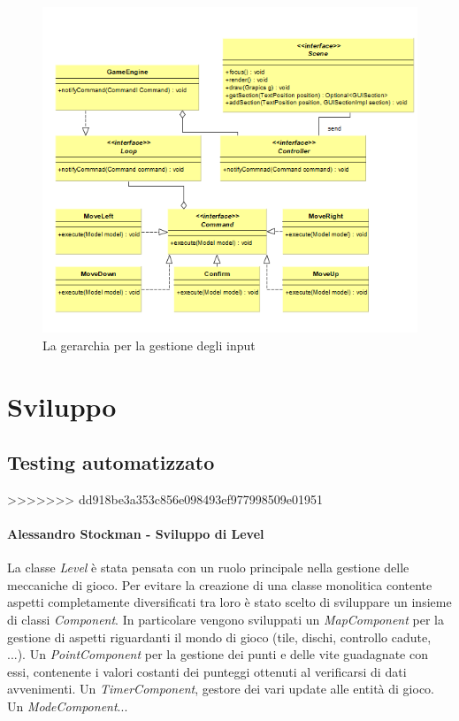 \documentclass[a4paper,12pt, hidelinks]{report}
\begin{document}
\begin{figure}[H]
\centering{}
\includegraphics[width=\linewidth]{img/PatternCommand}
\caption{La gerarchia per la gestione degli input}
\label{img:GerarchiaSound}
\end{figure}


\chapter{Sviluppo}
\section{Testing automatizzato}
>>>>>>> dd918be3a353c856e098493ef977998509e01951

\begin{flushright}
\item\subsubsection{Alessandro Stockman - Sviluppo di Level}
\end{flushright}

La classe \emph{Level} è stata pensata con un ruolo principale nella gestione delle meccaniche di gioco. Per evitare la creazione di una classe monolitica contente aspetti completamente diversificati tra loro è stato scelto di sviluppare un insieme di classi \emph{Component}.
In particolare vengono sviluppati un \emph{MapComponent} per la gestione di aspetti riguardanti il mondo di gioco (tile, dischi, controllo cadute, ...). 
Un \emph{PointComponent} per la gestione dei punti e delle vite guadagnate con essi, contenente i valori costanti dei punteggi ottenuti al verificarsi di dati avvenimenti.
Un \emph{TimerComponent}, gestore dei vari update alle entità di gioco.
Un \emph{ModeComponent}...
\end{document}
